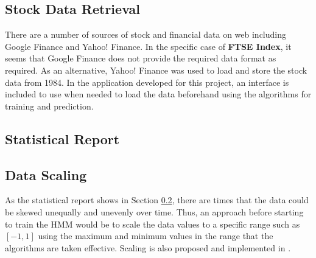 \documentclass{acm_proc_article-sp}
\begin{document}
\subsection{Stock Data Retrieval} \label{sec:data} 
There are a number of sources of stock and financial data on web including Google Finance and Yahoo! Finance. In the
specific case of \textbf{FTSE Index}, it seems that Google Finance does not provide the required data format as
required. As an alternative, Yahoo! Finance was used to load and store the stock data from 1984. In the application
developed for this project, an interface is included to use when needed to load the data beforehand using the
algorithms for training and prediction.

\subsection{Statistical Report} \label{sec:stats}

\subsection{Data Scaling} \label{sec:scale}
As the statistical report shows in Section \ref{sec:stats}, there are times that the data could be skewed unequally and
unevenly over time. Thus, an approach before starting to train the HMM would be to scale the data values to a specific
range such as $[-1, 1]$ using the maximum and minimum values in the range that the algorithms are taken effective.
Scaling is also proposed and implemented in \cite{hassan:hmm_stock_fuzzy}.
\end{document}
